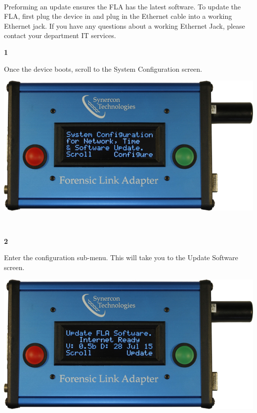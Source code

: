 \documentclass[11pt, oneside]{book}
\begin{document}
\paragraph{  }
Preforming an update ensures the FLA has the latest software. To update the FLA, first plug the device in and plug in the Ethernet cable into a working Ethernet jack. If you have any questions about a working Ethernet Jack, please contact your department IT services.
\\[\baselineskip]
\noindent\begin{minipage}{0.45\textwidth}%
\begin{center}
\textbf{1}\\[\baselineskip]
\end{center}
Once the device boots, scroll to the System Configuration screen.
\end{minipage}%
\hfill%
\begin{minipage}{0.45\textwidth}
\includegraphics[width=\linewidth]{../media/fla_screens/ethernet_and_others/main/sys_conf}
\end{minipage}
\\[\baselineskip]
\noindent\begin{minipage}{0.45\textwidth}%
\begin{center}
\textbf{2}\\[\baselineskip]
\end{center}
Enter the configuration sub-menu. This will take you to the Update Software screen.
\end{minipage}%
\hfill%
\begin{minipage}{0.45\textwidth}
\includegraphics[width=\linewidth]{../media/fla_screens/ethernet_and_others/sys_conf/update_software}
\end{minipage}
\end{document}
